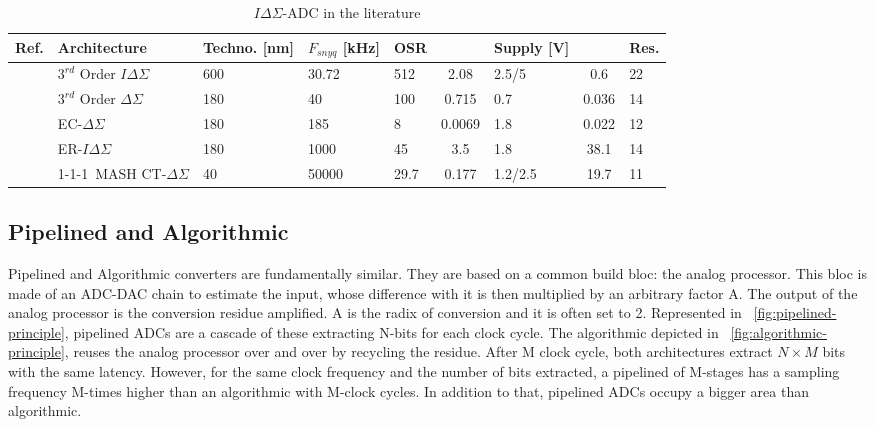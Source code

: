 \begin{table}[htp]
	\caption{\(I\Delta\Sigma \)-ADC in the literature}
	\centering
	\label{table:sigma_delta_comparison_table}
	\begin{tabular}{L{3.5\charwidth} R{16.5\charwidth} R{6\charwidth} C{5\charwidth} R{4\charwidth} S[table-format=2.2, table-column-width=6\charwidth] R{6\charwidth} S[table-format=2.2, table-column-width=6\charwidth] C{3.5\charwidth}}
	\toprule
	Ref. & Architecture & Techno. [nm] & \(F_{snyq}\) [kHz] & OSR & {} & Supply [V] & {} & Res. \\
	\midrule
	\cite{Quiquempoix2006} & \(3^{rd}\) Order \(I\Delta\Sigma \) & 600 & 30.72 & 512 & 2.08 & 2.5/5 & 0.6 & 22 \\
	\cite{Chae2009} & \(3^{rd}\) Order \(\Delta\Sigma \) & 180 & 40 & 100 & 0.715 & 0.7 & 0.036 & 14 \\
	\cite{Jeon2017} & EC-\(\Delta\Sigma \) & 180 & 185 & 8 & 0.0069 & 1.8 & 0.022 & 12 \\
	\cite{Agah2010} & ER-\(I\Delta\Sigma \) & 180 & 1000 & 45 & 3.5 & 1.8 & 38.1 & 14 \\
	\cite{Liu2017} & 1-1-1~MASH CT-\(\Delta\Sigma \) & 40 & 50000 & 29.7 & 0.177 & 1.2/2.5 & 19.7 & 11 \\
	\bottomrule
	\end{tabular}
\end{table}

\subsection{Pipelined and Algorithmic}               %
\label{sec:pipe-adc}
Pipelined and Algorithmic converters are fundamentally similar. They are based on a common build bloc: the analog processor. This bloc is made of an ADC-DAC chain to estimate the input, whose difference with it is then multiplied by an arbitrary factor A. The output of the analog processor is the conversion residue amplified. A is the radix of conversion and it is often set to 2. Represented in \figurename~\ref{fig:pipelined-principle}, pipelined ADCs are a cascade of these extracting N-bits for each clock cycle. The algorithmic depicted in \figurename~\ref{fig:algorithmic-principle}, reuses the analog processor over and over by recycling the residue. After M clock cycle, both architectures extract $N\times M$ bits with the same latency. However, for the same clock frequency and the number of bits extracted, a pipelined of M-stages has a sampling frequency M-times higher than an algorithmic with M-clock cycles. In addition to that, pipelined ADCs occupy a bigger area than algorithmic.

